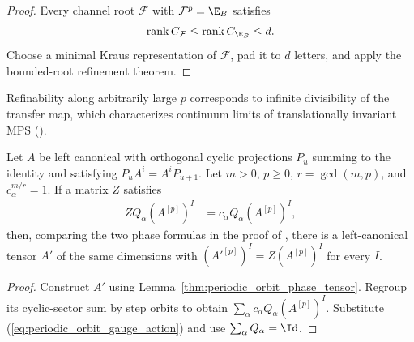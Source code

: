 \begin{proof}\leanok
    Every channel root $\mathcal F$ with $\mathcal F^p=\E_B$ satisfies
    \begin{align}
        \operatorname{rank}C_{\mathcal F}\le
        \operatorname{rank}C_{\E_B}\le d. \notag
    \end{align}
    Choose a minimal Kraus representation of $\mathcal F$, pad it to $d$
    letters, and apply the bounded-root refinement theorem.
\end{proof}

\begin{remark}\notready
    \label{rem:thm_4_1_continuum_limit}
    Refinability along arbitrarily large $p$ corresponds to infinite
    divisibility of the transfer map, which characterizes continuum limits of
    translationally invariant MPS (\cite{DeLasCuevas2017Irreducible}).
\end{remark}

\begin{lemma}
    \label{thm:periodic_absorb_orbit_gauge}
    \leanok
    Let $A$ be left canonical with orthogonal cyclic projections $P_u$
    summing to the identity and satisfying $P_uA^i=A^iP_{u+1}$.
    Let $m>0$, $p\ge0$, $r=\gcd(m,p)$, and $c_\alpha^{m/r}=1$.
    If a matrix $Z$ satisfies
    \begin{align}
        \label{eq:periodic_orbit_gauge_action}
        ZQ_\alpha(A^{[p]})^I & =c_\alpha Q_\alpha(A^{[p]})^I,
    \end{align}
    then, comparing the two phase formulas in the proof of
    \cite[Theorem~4.1]{DeLasCuevas2017Irreducible}, there is a left-canonical
    tensor $A'$ of the same dimensions with
    $(A'^{[p]})^I=Z(A^{[p]})^I$ for every $I$.
\end{lemma}

\begin{proof}
    \leanok
    Construct $A'$ using Lemma~\ref{thm:periodic_orbit_phase_tensor}.
    Regroup its cyclic-sector sum by step orbits to obtain
    $\sum_\alpha c_\alpha Q_\alpha(A^{[p]})^I$.
    Substitute (\ref{eq:periodic_orbit_gauge_action}) and use
    $\sum_\alpha Q_\alpha=\Id$.
\end{proof}

